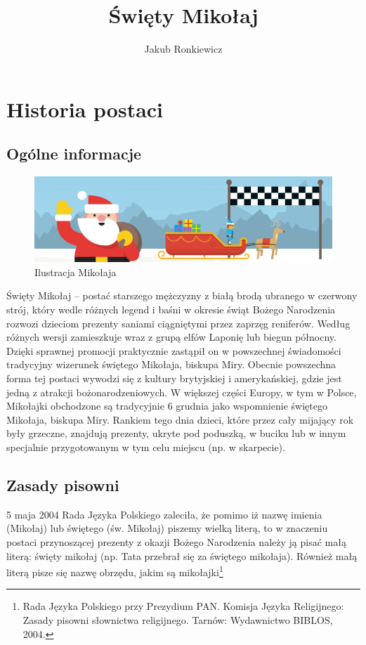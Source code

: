 \documentclass[oneside, fleqn]{book}
\title{Święty Mikołaj}
\author{Jakub Ronkiewicz}
\begin{document}
\frontmatter
\maketitle
\tableofcontents %
\mainmatter
\chapter{Historia postaci}
\section{Ogólne informacje}
\begin{figure}[hb]
\centering
\includegraphics[width=\textwidth]{1.png}
\caption{Ilustracja Mikołaja}\label{rys:mik:1}
\end{figure}
\noindent
Święty Mikołaj – postać starszego mężczyzny z białą brodą ubranego w czerwony strój, który wedle różnych legend i baśni w okresie świąt Bożego Narodzenia rozwozi dzieciom prezenty saniami ciągniętymi przez zaprzęg reniferów. Według różnych wersji zamieszkuje wraz z grupą elfów Laponię lub biegun północny. Dzięki sprawnej promocji praktycznie zastąpił on w powszechnej świadomości tradycyjny wizerunek świętego Mikołaja, biskupa Miry.\cite{nic} Obecnie powszechna forma tej postaci wywodzi się z kultury brytyjskiej i amerykańskiej, gdzie jest jedną z atrakcji bożonarodzeniowych. W większej części Europy, w tym w Polsce, Mikołajki obchodzone są tradycyjnie 6 grudnia jako wspomnienie świętego Mikołaja, biskupa Miry. Rankiem tego dnia dzieci, które przez cały mijający rok były grzeczne, znajdują prezenty, ukryte pod poduszką, w buciku lub w innym specjalnie przygotowanym w tym celu miejscu (np. w skarpecie).\newpage
\section{Zasady pisowni}
5 maja 2004 Rada Języka Polskiego zaleciła, że pomimo iż nazwę imienia (Mikołaj) lub świętego (św. Mikołaj) piszemy wielką literą, to w znaczeniu postaci przynoszącej prezenty z okazji Bożego Narodzenia należy ją pisać małą literą: święty mikołaj (np. Tata przebrał się za świętego mikołaja). Również małą literą pisze się nazwę obrzędu, jakim są mikołajki\footnote{Rada Języka Polskiego przy Prezydium PAN. Komisja Języka Religijnego: Zasady pisowni słownictwa religijnego. Tarnów: Wydawnictwo BIBLOS, 2004.}
\end{document}
